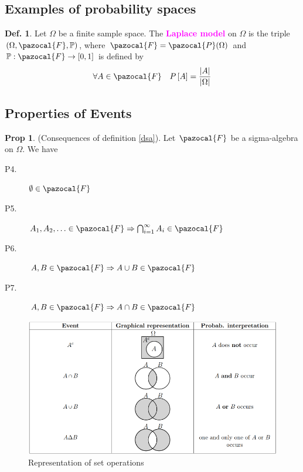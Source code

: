 \documentclass[8pt,a4paper,landscape]{article}
\theoremstyle{definition}
\newtheorem{definition}{Def.}[section]
\theoremstyle{example}
\theoremstyle{intuition}
\theoremstyle{definition}
\newtheorem{proposition}{Prop}[section]
\newcommand{\Fb}{\pazocal{F}}
\newcommand{\Pb}{\pazocal{P}}
\newcommand{\mydef}[1]{\textcolor{magenta}{\textbf{#1}}}
\DeclarePairedDelimiter\abs{\lvert}{\rvert}%
\begin{document}
\begin{multicols}{3}
				
				
			\subsection{Examples of probability spaces}
			
				\begin{definition}
					Let $\Omega$ be a finite sample space. The \mydef{Laplace model} on $\Omega$ is the triple $(\Omega,\Fb, \mathbb{P})$, where $\Fb = \Pb(\Omega)$ and $\mathbb{P}: \Fb \to \left[0,1\right]$ is defined by
						$$
							\forall A \in \Fb \quad P\left[ A \right] = \frac{\abs{A}}{\abs{\Omega}}
						$$
				\end{definition}
				
				
			\subsection{Properties of Events}
				
				\begin{proposition}
					(Consequences of definition \ref{dsa}). Let $\Fb$ be a sigma-algebra on $\Omega$. We have
					\begin{description} 
						\item[P4.]  $\emptyset \in \Fb$
						\item[P5.] $A_1, A_2, \ldots \in \Fb \Rightarrow \bigcap_{i=1}^{\infty}A_i \in \Fb$
						\item[P6.] $A,B \in \Fb \Rightarrow A \cup B \in \Fb$
						\item[P7.] $A,B \in \Fb \Rightarrow A \cap B \in \Fb$
					\end{description}
				\end{proposition}
				
				\begin{figure}[H]
					\includegraphics[width=\linewidth]{set-operations-representation.png}
					\caption{Representation of set operations}
				\end{figure}
				

\end{multicols}
\end{document}
